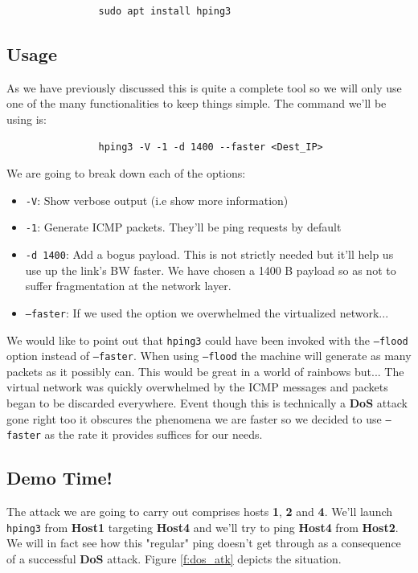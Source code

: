 \documentclass[12pt]{report}
\begin{document}
			\begin{verbatim}
				sudo apt install hping3
			\end{verbatim}

		\subsection{Usage}
			As we have previously discussed this is quite a complete tool so we will only use one of the many functionalities to keep things simple. The command we'll be using is:

			\begin{verbatim}
				hping3 -V -1 -d 1400 --faster <Dest_IP>
			\end{verbatim}

			We are going to break down each of the options:

			\begin{itemize}
				\item \texttt{-V}: Show verbose output (i.e show more information)
				\item \texttt{-1}: Generate ICMP packets. They'll be ping requests by default
				\item \texttt{-d 1400}: Add a bogus payload. This is not strictly needed but it'll help us use up the link's BW faster. We have chosen a 1400 B payload so as not to suffer fragmentation at the network layer.
				\item \texttt{--faster}: If we used the  option we overwhelmed the virtualized network...
			\end{itemize}

			We would like to point out that \texttt{hping3} could have been invoked with the \texttt{--flood} option instead of \texttt{--faster}. When using \texttt{--flood} the machine will generate as many packets as it possibly can. This would be great in a world of rainbows but... The virtual network was quickly overwhelmed by the ICMP messages and packets began to be discarded everywhere. Event though this is technically a \textbf{DoS} attack gone right too it obscures the phenomena we are faster so we decided to use \texttt{--faster} as the rate it provides suffices for our needs.

		\subsection{Demo Time!}
			The attack we are going to carry out comprises hosts \textbf{1}, \textbf{2} and \textbf{4}. We'll launch \texttt{hping3} from \textbf{Host1} targeting \textbf{Host4} and we'll try to ping \textbf{Host4} from \textbf{Host2}. We will in fact see how this "regular" ping doesn't get through as a consequence of a successful \textbf{DoS} attack. Figure \ref{f:dos_atk} depicts the situation.
\end{document}
